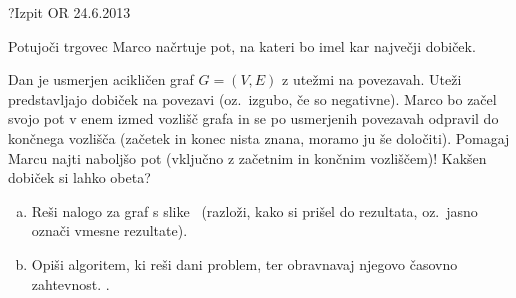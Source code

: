 \begin{naloga}{?}{Izpit OR 24.6.2013}
\begin{vprasanje}
Potujoči trgovec Marco načrtuje pot, na kateri bo imel kar največji dobiček.

Dan je usmerjen acikličen graf $G = (V, E)$ z utežmi na povezavah.
Uteži predstavljajo dobiček na povezavi (oz.~izgubo, če so negativne).
Marco bo začel svojo pot v enem izmed vozlišč grafa
in se po usmerjenih povezavah odpravil do končnega vozlišča
(začetek in konec nista znana, moramo ju še določiti).
Pomagaj Marcu najti naboljšo pot (vključno z začetnim in končnim vozliščem)!
Kakšen dobiček si lahko obeta?

\begin{enumerate}[(a)]
\item Reši nalogo za graf s slike~\fig{}
(razloži, kako si prišel do rezultata, oz.~jasno označi vmesne rezultate).

\item Opiši algoritem, ki reši dani problem,
ter obravnavaj njegovo časovno zahtevnost.
.
\end{enumerate}

\begin{slika}
\pgfslika
{}
\end{slika}
\end{vprasanje}
\begin{odgovor}
\end{odgovor}
\end{naloga}
